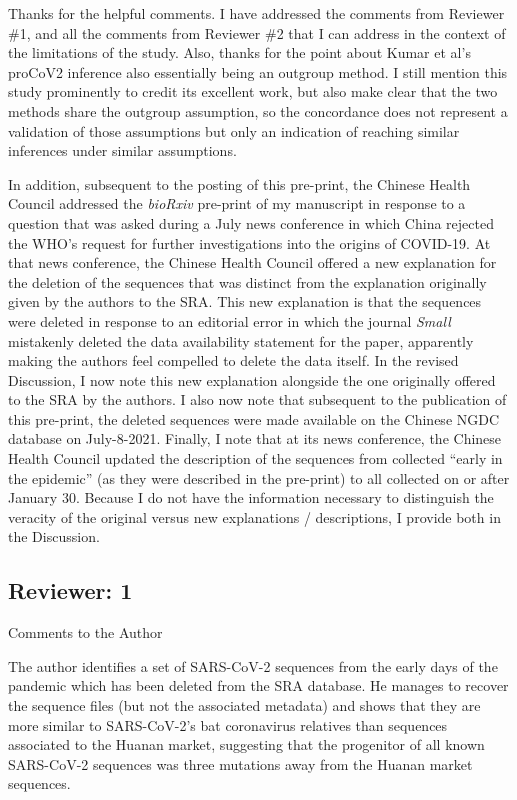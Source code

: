 \documentclass[11pt, oneside]{article}   	%
\newcommand{\response}[1]{{\color{black}#1}}
\begin{document}
\response{Thanks for the helpful comments. I have addressed the comments from Reviewer \#1, and all the comments from Reviewer \#2 that I can address in the context of the limitations of the study. Also, thanks for the point about Kumar et al's proCoV2 inference also essentially being an outgroup method. I still mention this study prominently to credit its excellent work, but also make clear that the two methods share the outgroup assumption, so the concordance does not represent a validation of those assumptions but only an indication of reaching similar inferences under similar assumptions.

In addition, subsequent to the posting of this pre-print, the Chinese Health Council addressed the \textit{bioRxiv} pre-print of my manuscript in response to a question that was asked during a July news conference in which China rejected the WHO's request for further investigations into the origins of COVID-19.
At that news conference, the Chinese Health Council offered a new explanation for the deletion of the sequences that was distinct from the explanation originally given by the authors to the SRA.
This new explanation is that the sequences were deleted in response to an editorial error in which the journal \textit{Small} mistakenly deleted the data availability statement for the paper, apparently making the authors feel compelled to delete the data itself.
In the revised Discussion, I now note this new explanation alongside the one originally offered to the SRA by the authors.
I also now note that subsequent to the publication of this pre-print, the deleted sequences were made available on the Chinese NGDC database on July-8-2021.
Finally, I note that at its news conference, the Chinese Health Council updated the description of the sequences from collected ``early in the epidemic'' (as they were described in the pre-print) to all collected on or after January 30.
Because I do not have the information necessary to distinguish the veracity of the original versus new explanations / descriptions, I provide both in the Discussion.
}

\subsection*{Reviewer: 1}

Comments to the Author

The author identifies a set of SARS-CoV-2 sequences from the early days of the pandemic which has been deleted from the SRA database. He manages to recover the sequence files (but not the associated metadata) and shows that they are more similar to SARS-CoV-2's bat coronavirus relatives than sequences associated to the Huanan market, suggesting that the progenitor of all known SARS-CoV-2 sequences was three mutations away from the Huanan market sequences.
\end{document}
